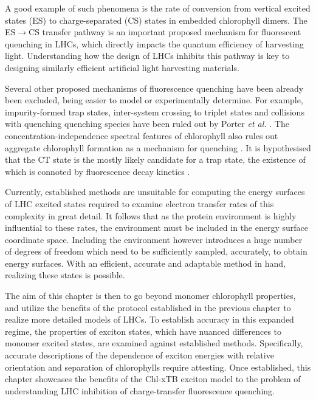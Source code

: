 A good example of such phenomena is the rate of conversion from vertical excited
states (ES) to charge-separated (CS) states in embedded chlorophyll dimers. The ES$\rightarrow$CS
transfer pathway is an important proposed mechanism for fluorescent quenching in
LHCs, which directly impacts the quantum efficiency of harvesting light. Understanding 
how the design of LHCs inhibits this pathway is key to designing similarly efficient
artificial light harvesting materials.

Several other proposed mechanisms of fluorescence quenching have been already been 
excluded, being easier to model or experimentally determine. For example, impurity-formed
trap states, inter-system crossing to triplet states and collisions with quenching
quenching species have been ruled out by Porter \emph{et al.} \cite{Kelly1970}. 
The concentration-independence spectral features of chlorophyll also rules out aggregate
chlorophyll formation as a mechanism for quenching \cite{Kelly1970, Kelly1971, Beddard1976a}. 
It is hypothesised that the CT state is the mostly likely candidate for a trap state,
\cite{Gutschick1978, Seely1978, Kelly1971} the existence of which is connoted by 
fluorescence decay kinetics  \cite{Yuen1980}.

Currently, established methods are unsuitable for computing the energy surfaces of 
LHC excited states required to examine electron transfer rates of this complexity 
in great detail. It follows that as the protein environment is highly influential
to these rates, the environment must be included in the energy surface coordinate
space. Including the environment however introduces a huge number of degrees of 
freedom which need to be sufficiently sampled, accurately, to obtain energy surfaces. 
With an efficient, accurate and adaptable method in hand, realizing these states
is possible.

The aim of this chapter is then to go beyond monomer chlorophyll properties, and 
utilize the benefits of the protocol established in the previous chapter to realize
more detailed models of LHCs. To establish accuracy in this expanded regime, the 
properties of exciton states, which have nuanced differences to monomer excited 
states, are examined against established methods. Specifically, accurate descriptions
of the dependence of exciton energies with relative orientation and separation of 
chlorophylls require attesting. Once established, this chapter showcases the benefits
of the Chl-xTB exciton model to the problem of understanding LHC inhibition of 
charge-transfer fluorescence quenching.

